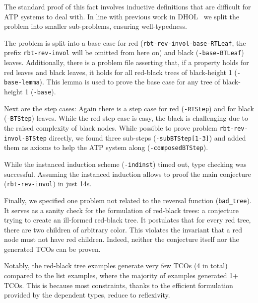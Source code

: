 The standard proof of this fact involves inductive definitions that are difficult
for ATP systems to deal with. In line with previous work in DHOL~\cite{dhol_satallax,RBK24} we
split the problem into smaller sub-problems, ensuring well-typedness.

The problem is split into a base case for red (\texttt{rbt-rev-invol-base-RTLeaf}, the prefix
\texttt{rbt-rev-invol} will be omitted from here on) and black (\texttt{-base-BTLeaf})
leaves. Additionally, there is a problem file asserting 
that, if a property holds for red leaves and black leaves, it holds for all red-black trees of
black-height 1 (\texttt{-base-lemma}). This lemma is used to prove the base case
for any tree of black-height 1 (\texttt{-base}).

Next are the step cases: Again there is a step case for red (\texttt{-RTStep}) and for black
(\texttt{-BTStep}) leaves. While the red
step case is easy, the black is challenging due to the raised complexity of black nodes. While
possible to prove problem \texttt{rbt-rev-invol-BTStep} directly, we found three sub-steps
(\texttt{-subBTStep[1-3]}) and added them as axioms to help the ATP system along
(\texttt{-composedBTStep}). 

While the instanced induction scheme (\texttt{-indinst}) timed out, type checking
was successful. Assuming the instanced induction allows to proof the main conjecture
(\texttt{rbt-rev-invol}) in just 14s.


Finally, we specified one problem not related to the reversal function (\texttt{bad\_tree}). It serves as a sanity
check for the formulation of red-black trees: a conjecture trying to create an ill-formed
red-black tree. It postulates that for every red tree, there are two children of arbitrary
color. This violates the invariant that a red node must not have red children. Indeed, neither
the conjecture itself nor the generated TCOs %
can be proven. %

Notably, the red-black tree examples generate very few TCOs (4
in total) compared to the list examples, where the majority of examples generated 1+ TCOs.
This is %
because most constraints, thanks to the efficient formulation %
provided by the dependent types, reduce to reflexivity. 

